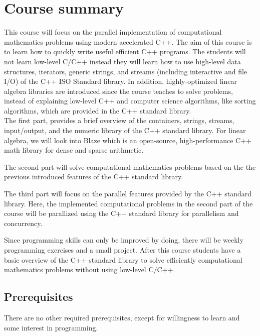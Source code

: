 \documentclass[11pt,letterpaper]{article}
\begin{document}
\section*{Course summary}
This course will focus on the parallel implementation of computational mathematics problems using modern accelerated C++. The aim of this course is to learn how to quickly write useful efficient C++ programs. The students will not learn low-level C/C++ instead they will learn how to use high-level data structures, iterators, generic strings, and streams (including interactive and file I/O) of the C++ ISO Standard library. In addition, highly-optimized linear algebra libraries are introduced since the course teaches to solve problems, instead of explaining low-level C++ and computer science algorithms, like sorting algorithms, which are provided in the C++ standard library.\\

\noindent
The first part, provides a brief overview of the containers, strings, streams, input/output, and the numeric library of the C++ standard library. For linear algebra, we will look into Blaze which is an open-source, high-performance C++ math library for dense and sparse arithmetic.

The second part will solve computational mathematics problems based-on the the previous introduced features of the C++ standard library.

The third part will focus on the parallel features provided by the C++ standard library. Here, the implemented computational problems in the second part of the course will be parallized using the C++ standard library for parallelism and concurrency.

Since programming skills can only be improved by doing, there will be weekly programming exercises and a small project. After this course students have a basic overview of the C++ standard library to solve efficiently computational mathematics problems without using low-level C/C++.
\subsection*{Prerequisites}
There are no other required prerequisites, except for willingness to learn and some interest in programming. 
\end{document}
